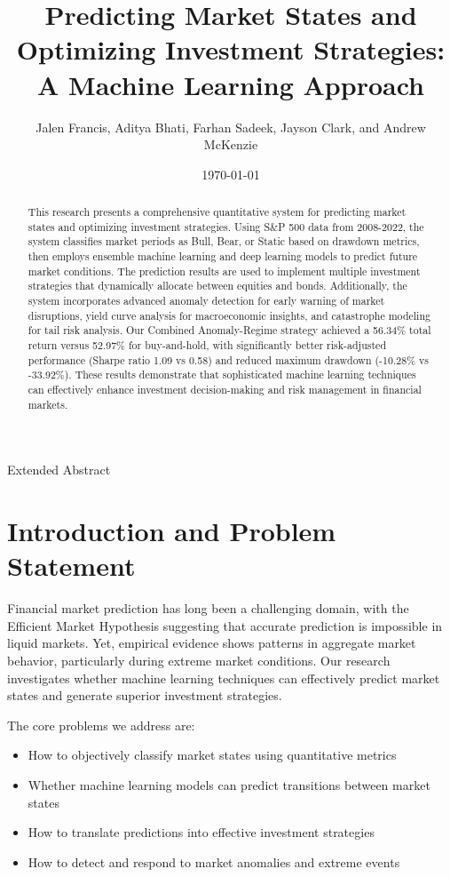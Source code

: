 \documentclass[13pt]{article}
\title{Predicting Market States and Optimizing Investment Strategies: \\
A Machine Learning Approach}
\author{Jalen Francis, Aditya Bhati, Farhan Sadeek, Jayson Clark, and Andrew McKenzie}
\date{\today}
\makeatletter
\renewcommand{\maketitle}{%
    \begin{center}
        \vspace*{0.5cm}
        \Large\@title
        
        \vspace{0.4cm}
        \large\@author
        
        \vspace{0.5cm}
        \normalsize\text{Quantathon 2025}
        
        \vspace{0.3cm}
        \normalsize Extended Abstract
        \vspace{0.5cm}
    \end{center}
}
\makeatother
\begin{document}
\maketitle

\begin{abstract}
	This research presents a comprehensive quantitative system for predicting market states and optimizing investment strategies. Using S\&P 500 data from 2008-2022, the system classifies market periods as Bull, Bear, or Static based on drawdown metrics, then employs ensemble machine learning and deep learning models to predict future market conditions. The prediction results are used to implement multiple investment strategies that dynamically allocate between equities and bonds. Additionally, the system incorporates advanced anomaly detection for early warning of market disruptions, yield curve analysis for macroeconomic insights, and catastrophe modeling for tail risk analysis. Our Combined Anomaly-Regime strategy achieved a 56.34\% total return versus 52.97\% for buy-and-hold, with significantly better risk-adjusted performance (Sharpe ratio 1.09 vs 0.58) and reduced maximum drawdown (-10.28\% vs -33.92\%). These results demonstrate that sophisticated machine learning techniques can effectively enhance investment decision-making and risk management in financial markets.
\end{abstract}

\section{Introduction and Problem Statement}
Financial market prediction has long been a challenging domain, with the Efficient Market Hypothesis suggesting that accurate prediction is impossible in liquid markets. Yet, empirical evidence shows patterns in aggregate market behavior, particularly during extreme market conditions. Our research investigates whether machine learning techniques can effectively predict market states and generate superior investment strategies.

The core problems we address are:
\begin{itemize}
	\item How to objectively classify market states using quantitative metrics
	\item Whether machine learning models can predict transitions between market states
	\item How to translate predictions into effective investment strategies
	\item How to detect and respond to market anomalies and extreme events
\end{itemize}
\end{document}
